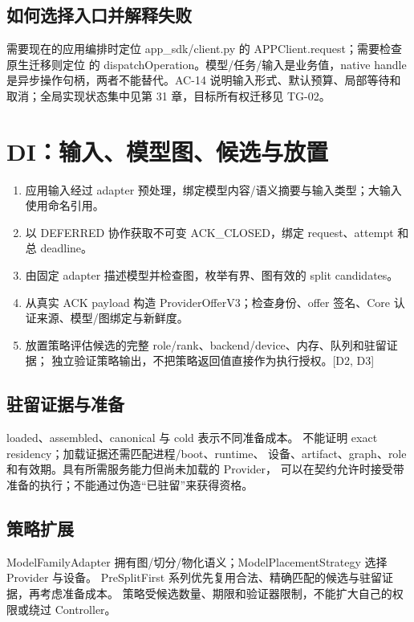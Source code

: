 \subsection{如何选择入口并解释失败}
需要现在的应用编排时定位 app\_sdk/client.py 的 APPClient.request；需要检查原生迁移则定位  的 dispatchOperation。模型/任务/输入是业务值，native handle 是异步操作句柄，两者不能替代。AC-14 说明输入形式、默认预算、局部等待和取消；全局实现状态集中见第 31 章，目标所有权迁移见 TG-02。

\newpage

\section{DI：输入、模型图、候选与放置}
\begin{enumerate}
\item 应用输入经过 adapter 预处理，绑定模型内容/语义摘要与输入类型；大输入使用命名引用。
\item 以 DEFERRED 协作获取不可变 ACK\_CLOSED，绑定 request、attempt 和总 deadline。
\item 由固定 adapter 描述模型并检查图，枚举有界、图有效的 split candidates。
\item 从真实 ACK payload 构造 ProviderOfferV3；检查身份、offer 签名、Core 认证来源、模型/图绑定与新鲜度。
\item 放置策略评估候选的完整 role/rank、backend/device、内存、队列和驻留证据；
独立验证策略输出，不把策略返回值直接作为执行授权。[D2, D3]
\end{enumerate}

\subsection{驻留证据与准备}
loaded、assembled、canonical 与 cold 表示不同准备成本。
 不能证明 exact residency；加载证据还需匹配进程/boot、runtime、
设备、artifact、graph、role 和有效期。具有所需服务能力但尚未加载的 Provider，
可以在契约允许时接受带准备的执行；不能通过伪造“已驻留”来获得资格。

\subsection{策略扩展}
ModelFamilyAdapter 拥有图/切分/物化语义；ModelPlacementStrategy 选择 Provider 与设备。
PreSplitFirst 系列优先复用合法、精确匹配的候选与驻留证据，再考虑准备成本。
策略受候选数量、期限和验证器限制，不能扩大自己的权限或绕过 Controller。

